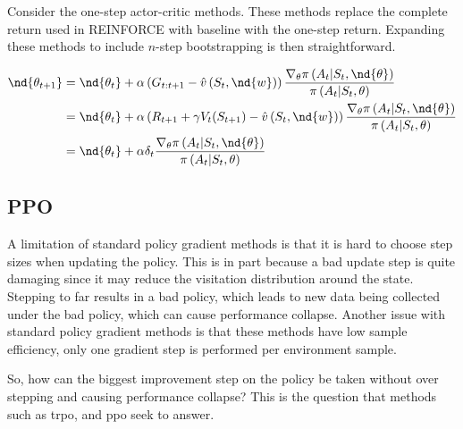 Consider the one-step actor-critic methods. These methods replace the complete return used in REINFORCE with baseline with the one-step return. Expanding these methods to include $n$-step bootstrapping is then straightforward.

\begin{align}
  \nd{\theta_{t+1}} &= \nd{\theta_t} + \alpha \left(G_{t:t+1} - \hat{v}\left(S_t, \nd{w}\right)\right) \frac{\nabla_\theta \pi\left(A_t|S_t, \nd{\theta}\right)}{\pi\left(A_t|S_t,\theta\right)}\\
  &= \nd{\theta_t} + \alpha \left(R_{t+1} + \gamma V_t(S_{t+1}) - \hat{v}\left(S_t, \nd{w}\right)\right) \frac{\nabla_\theta \pi\left(A_t|S_t, \nd{\theta}\right)}{\pi\left(A_t|S_t,\theta\right)}\\
  &= \nd{\theta_t} + \alpha \delta_t \frac{\nabla_\theta \pi\left(A_t|S_t, \nd{\theta}\right)}{\pi\left(A_t|S_t,\theta\right)}
  \label{eq:actor-critic_1}
\end{align}



\subsection{PPO}
A limitation of standard policy gradient methods is that it is hard to choose step sizes when updating the policy. This is in part because a bad update step is quite damaging since it may reduce the visitation distribution around the state. Stepping to far results in a bad policy, which leads to new data being collected under the bad policy, which can cause performance collapse. Another issue with standard policy gradient methods is that these methods have low sample efficiency, only one gradient step is performed per environment sample\cite{schulman2017proximal, schulman2015trust}.

So, how can the biggest improvement step on the policy be taken without over stepping and causing performance collapse? This is the question that methods such as \acrfull{trpo}, and \acrfull{ppo} seek to answer.



